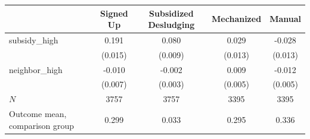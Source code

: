 \begin{tabular}{lcccc}
\hline\hline
 & Signed Up & Subsidized Desludging & Mechanized & Manual \\
\hline
subsidy_high & 0.191 & 0.080 & 0.029 & -0.028 \\
 & (0.015) & (0.009) & (0.013) & (0.013) \\
neighbor_high & -0.010 & -0.002 & 0.009 & -0.012 \\
 & (0.007) & (0.003) & (0.005) & (0.005) \\
\hline
$N$ & 3757 & 3757 & 3395 & 3395 \\
Outcome mean, comparison group & 0.299 & 0.033 & 0.295 & 0.336 \\
\hline\hline
\end{tabular}
